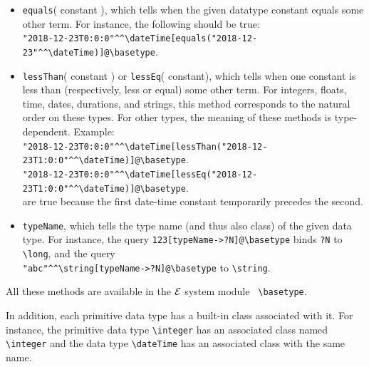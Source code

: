 \documentclass[11pt]{article}
\newcommand{\ERGO}{\mbox{\ensuremath{\cal{E}}\smaller{{\sc{RGO}}}}\xspace}
\newcommand{\FLSYSTEM}{\ERGO}
\newcommand{\bs}{\textbackslash}
\begin{document}
\begin{itemize}
      For instance,\\
      \verb|?T[isTypeOf("12:13:44"^^\time)]@\basetype| will bind
      \texttt{?T} to \texttt{\bs{}time} and  
      \\
      \verb|?T[isTypeOf(123)]@\basetype| will bind \texttt{?T} to
      \texttt{\bs{}long}. 
    \item {\tt equals}( constant ), which tells when the given datatype constant equals some other term.
      For instance, the following should be true:
      \\
      \verb|"2018-12-23T0:0:0"^^\dateTime[equals("2018-12-23"^^\dateTime)]@\basetype|.
    \item {\tt lessThan}( constant ) or \texttt{lessEq}( constant), which tells when one constant is
      less than (respectively, less or equal)
      some other term. For integers, floats, time, dates,
      durations, and strings, this method corresponds to the natural order
      on these types. For other types, the meaning of these methods is type-dependent.
      Example:
      \\
      {\small
      \verb|"2018-12-23T0:0:0"^^\dateTime[lessThan("2018-12-23T1:0:0"^^\dateTime)]@\basetype|.
      \\
      \verb|"2018-12-23T0:0:0"^^\dateTime[lessEq("2018-12-23T1:0:0"^^\dateTime)]@\basetype|.
      }
      \\
      are true because the first date-time constant temporarily precedes
      the second.

    \item {\tt typeName}, which tells the type name (and thus also class)
      of the given data type.
      For instance, the query \verb|123[typeName->?N]@\basetype| binds \texttt{?N} to
      \texttt{\bs{}long}, and the query\\
      \verb|"abc"^^\string[typeName->?N]@\basetype|
      to \texttt{\bs{}string}.   
    \end{itemize}

    \noindent
    All these methods are available in the \FLSYSTEM system module {\tt
      \bs{}basetype}. 

In addition, each primitive data type has a built-in class associated with it.
For instance, the primitive data type {\tt \bs{}integer} has an associated
class  named {\tt \bs{}integer} and the data type {\tt \bs{}dateTime} has an
associated class with the same name.  
\end{document}
